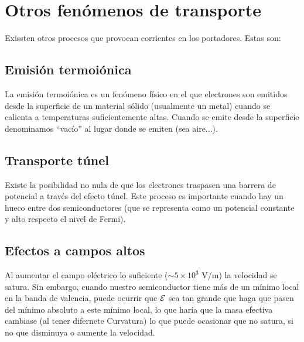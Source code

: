 \section{Otros fenómenos de transporte}

Exissten otros procesos que provocan corrientes en los portadores. Estas son:

\subsection{Emisión termoiónica}

La emisión termoiónica es un fenómeno físico en el que electrones son emitidos desde la superficie de un material sólido (usualmente un metal) cuando se calienta a temperaturas suficientemente altas. Cuando se emite desde la superficie denominamos ``vacío'' al lugar donde se emiten (sea aire...).

\subsection{Transporte túnel}

Existe la posibilidad no nula de que los electrones traspasen una barrera de potencial a través del efecto túnel. Este proceso es importante cuando hay un hueco entre dos semiconductores (que se representa como un potencial constante y alto respecto el nivel de Fermi). 


\subsection{Efectos a campos altos}

Al aumentar el campo eléctrico lo suficiente ($\sim 5 \times 10^3$ V/m) la velocidad se satura. Sin embargo, cuando nuestro semiconductor tiene más de un mínimo local en la banda de valencia, puede ocurrir que $\mathcal{E}$ sea tan grande que haga que pasen del mínimo absoluto a este mínimo local, lo que haría que la masa efectiva cambiase (al tener difernete Curvatura) lo que puede ocasionar que no satura, si no que disminuya o aumente la velocidad.



\newpage




